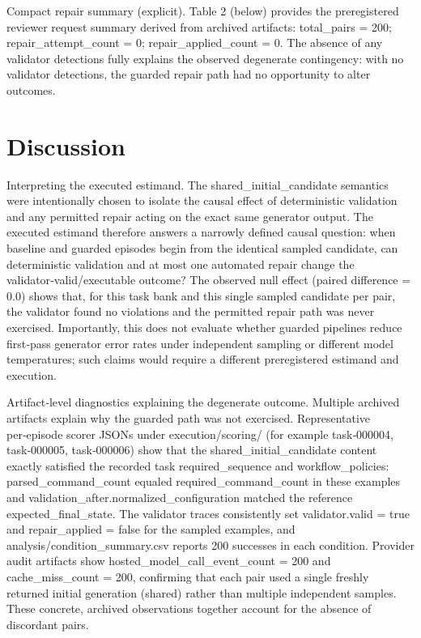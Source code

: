 \documentclass[conference]{IEEEtran}
\begin{document}
Compact repair summary (explicit). Table 2 (below) provides the preregistered reviewer request summary derived from archived artifacts: total\_pairs = 200; repair\_attempt\_count = 0; repair\_applied\_count = 0. The absence of any validator detections fully explains the observed degenerate contingency: with no validator detections, the guarded repair path had no opportunity to alter outcomes.

\section{Discussion}
Interpreting the executed estimand. The shared\_initial\_candidate semantics were intentionally chosen to isolate the causal effect of deterministic validation and any permitted repair acting on the exact same generator output. The executed estimand therefore answers a narrowly defined causal question: when baseline and guarded episodes begin from the identical sampled candidate, can deterministic validation and at most one automated repair change the validator‑valid/executable outcome? The observed null effect (paired difference = 0.0) shows that, for this task bank and this single sampled candidate per pair, the validator found no violations and the permitted repair path was never exercised. Importantly, this does not evaluate whether guarded pipelines reduce first‑pass generator error rates under independent sampling or different model temperatures; such claims would require a different preregistered estimand and execution.

Artifact‑level diagnostics explaining the degenerate outcome. Multiple archived artifacts explain why the guarded path was not exercised. Representative per‑episode scorer JSONs under execution/scoring/ (for example task‑000004, task‑000005, task‑000006) show that the shared\_initial\_candidate content exactly satisfied the recorded task required\_sequence and workflow\_policies: parsed\_command\_count equaled required\_command\_count in these examples and validation\_after.normalized\_configuration matched the reference expected\_final\_state. The validator traces consistently set validator.valid = true and repair\_applied = false for the sampled examples, and analysis/condition\_summary.csv reports 200 successes in each condition. Provider audit artifacts show hosted\_model\_call\_event\_count = 200 and cache\_miss\_count = 200, confirming that each pair used a single freshly returned initial generation (shared) rather than multiple independent samples. These concrete, archived observations together account for the absence of discordant pairs.
\end{document}
